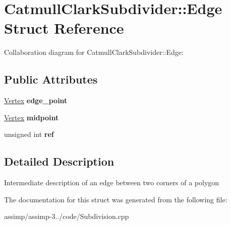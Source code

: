 \hypertarget{struct_catmull_clark_subdivider_1_1_edge}{\section{Catmull\+Clark\+Subdivider\+:\+:Edge Struct Reference}
\label{struct_catmull_clark_subdivider_1_1_edge}
}


Collaboration diagram for Catmull\+Clark\+Subdivider\+:\+:Edge\+:
\subsection*{Public Attributes}
\begin{DoxyCompactItemize}
\item 
\hypertarget{struct_catmull_clark_subdivider_1_1_edge_aac206295e5a861689f37a399645f9edd}{\hyperlink{struct_assimp_1_1_m_d2_1_1_vertex}{Vertex} {\bfseries edge\+\_\+point}}\label{struct_catmull_clark_subdivider_1_1_edge_aac206295e5a861689f37a399645f9edd}

\item 
\hypertarget{struct_catmull_clark_subdivider_1_1_edge_a53a99e2e41987a00618f7a37853b87d6}{\hyperlink{struct_assimp_1_1_m_d2_1_1_vertex}{Vertex} {\bfseries midpoint}}\label{struct_catmull_clark_subdivider_1_1_edge_a53a99e2e41987a00618f7a37853b87d6}

\item 
\hypertarget{struct_catmull_clark_subdivider_1_1_edge_a3e0424ae5b2637a1212090b11532ba11}{unsigned int {\bfseries ref}}\label{struct_catmull_clark_subdivider_1_1_edge_a3e0424ae5b2637a1212090b11532ba11}

\end{DoxyCompactItemize}


\subsection{Detailed Description}
Intermediate description of an edge between two corners of a polygon 

The documentation for this struct was generated from the following file\+:\begin{DoxyCompactItemize}
\item 
assimp/assimp-\/3../code/Subdivision.\+cpp\end{DoxyCompactItemize}
